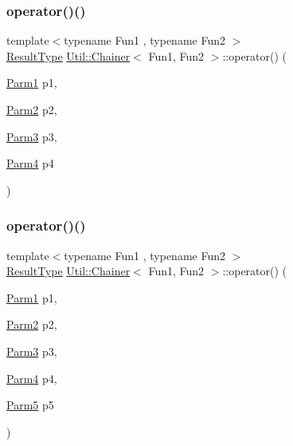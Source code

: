 \subsubsection{\texorpdfstring{operator()()}{operator()()}\hspace{0.1cm}{\footnotesize\ttfamily [10/12]}}
{\footnotesize\ttfamily template$<$typename Fun1 , typename Fun2 $>$ \\
\mbox{\hyperlink{classUtil_1_1Chainer_a2c8d88a77b8ba93eb915dc799ddafbb9}{Result\+Type}} \mbox{\hyperlink{classUtil_1_1Chainer}{Util\+::\+Chainer}}$<$ Fun1, Fun2 $>$\+::operator() (\begin{DoxyParamCaption}\item[{\mbox{\hyperlink{classUtil_1_1Chainer_a3e09b2267dabdd8d12070b09c47749c6}{Parm1}}}]{p1,  }\item[{\mbox{\hyperlink{classUtil_1_1Chainer_a1bfb0e8f35679278c85d232a74a107ff}{Parm2}}}]{p2,  }\item[{\mbox{\hyperlink{classUtil_1_1Chainer_ac28811d7153f7b7cf837f7b8626436c8}{Parm3}}}]{p3,  }\item[{\mbox{\hyperlink{classUtil_1_1Chainer_a82e756f3083e3883a05644425474f789}{Parm4}}}]{p4 }\end{DoxyParamCaption})\hspace{0.3cm}{\ttfamily [inline]}}

\mbox{\label{classUtil_1_1Chainer_a3aee5b0f14ad8a15d167dd319019a01a}} 
\subsubsection{\texorpdfstring{operator()()}{operator()()}\hspace{0.1cm}{\footnotesize\ttfamily [11/12]}}
{\footnotesize\ttfamily template$<$typename Fun1 , typename Fun2 $>$ \\
\mbox{\hyperlink{classUtil_1_1Chainer_a2c8d88a77b8ba93eb915dc799ddafbb9}{Result\+Type}} \mbox{\hyperlink{classUtil_1_1Chainer}{Util\+::\+Chainer}}$<$ Fun1, Fun2 $>$\+::operator() (\begin{DoxyParamCaption}\item[{\mbox{\hyperlink{classUtil_1_1Chainer_a3e09b2267dabdd8d12070b09c47749c6}{Parm1}}}]{p1,  }\item[{\mbox{\hyperlink{classUtil_1_1Chainer_a1bfb0e8f35679278c85d232a74a107ff}{Parm2}}}]{p2,  }\item[{\mbox{\hyperlink{classUtil_1_1Chainer_ac28811d7153f7b7cf837f7b8626436c8}{Parm3}}}]{p3,  }\item[{\mbox{\hyperlink{classUtil_1_1Chainer_a82e756f3083e3883a05644425474f789}{Parm4}}}]{p4,  }\item[{\mbox{\hyperlink{classUtil_1_1Chainer_ac5fdddd223aac1cfb37abd6d681ddf69}{Parm5}}}]{p5 }\end{DoxyParamCaption})\hspace{0.3cm}{\ttfamily [inline]}}

